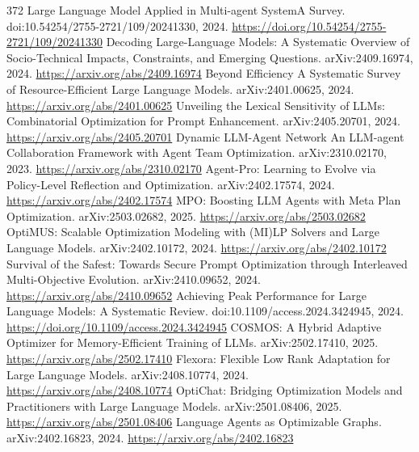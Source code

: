 \documentclass[11pt]{article}
\begin{document}
\begin{thebibliography}{372}
 Large Language Model Applied in Multi-agent SystemA Survey. doi:10.54254/2755-2721/109/20241330, 2024. \url{https://doi.org/10.54254/2755-2721/109/20241330}
 Decoding Large-Language Models: A Systematic Overview of Socio-Technical Impacts, Constraints, and Emerging Questions. arXiv:2409.16974, 2024. \url{https://arxiv.org/abs/2409.16974}
 Beyond Efficiency A Systematic Survey of Resource-Efficient Large Language Models. arXiv:2401.00625, 2024. \url{https://arxiv.org/abs/2401.00625}
 Unveiling the Lexical Sensitivity of LLMs: Combinatorial Optimization for Prompt Enhancement. arXiv:2405.20701, 2024. \url{https://arxiv.org/abs/2405.20701}
 Dynamic LLM-Agent Network An LLM-agent Collaboration Framework with Agent Team Optimization. arXiv:2310.02170, 2023. \url{https://arxiv.org/abs/2310.02170}
 Agent-Pro: Learning to Evolve via Policy-Level Reflection and Optimization. arXiv:2402.17574, 2024. \url{https://arxiv.org/abs/2402.17574}
 MPO: Boosting LLM Agents with Meta Plan Optimization. arXiv:2503.02682, 2025. \url{https://arxiv.org/abs/2503.02682}
 OptiMUS: Scalable Optimization Modeling with (MI)LP Solvers and Large Language Models. arXiv:2402.10172, 2024. \url{https://arxiv.org/abs/2402.10172}
 Survival of the Safest: Towards Secure Prompt Optimization through Interleaved Multi-Objective Evolution. arXiv:2410.09652, 2024. \url{https://arxiv.org/abs/2410.09652}
 Achieving Peak Performance for Large Language Models: A Systematic Review. doi:10.1109/access.2024.3424945, 2024. \url{https://doi.org/10.1109/access.2024.3424945}
 COSMOS: A Hybrid Adaptive Optimizer for Memory-Efficient Training of LLMs. arXiv:2502.17410, 2025. \url{https://arxiv.org/abs/2502.17410}
 Flexora: Flexible Low Rank Adaptation for Large Language Models. arXiv:2408.10774, 2024. \url{https://arxiv.org/abs/2408.10774}
 OptiChat: Bridging Optimization Models and Practitioners with Large Language Models. arXiv:2501.08406, 2025. \url{https://arxiv.org/abs/2501.08406}
 Language Agents as Optimizable Graphs. arXiv:2402.16823, 2024. \url{https://arxiv.org/abs/2402.16823}
\end{thebibliography}
\end{document}

